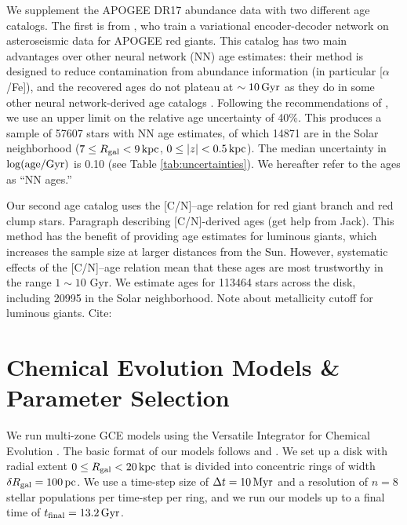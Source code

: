 \documentclass[twocolumn,twocolappendix,linenumbers]{aastex631}
\newcommand{\todo}[1]{{\color{red}#1}}
\begin{document}
We supplement the APOGEE DR17 abundance data with two different age catalogs. The first is from \citet{leung_variational_2023}, who train a variational encoder-decoder network on asteroseismic data for APOGEE red giants. This catalog has two main advantages over other neural network (NN) age estimates: their method is designed to reduce contamination from abundance information (in particular [$\alpha$/Fe]), and the recovered ages do not plateau at $\sim10\,{\rm Gyr}$ as they do in some other neural network-derived age catalogs \citep[e.g.,][]{mackereth_dynamical_2019}. Following the recommendations of \citet{leung_variational_2023}, we use an upper limit on the relative age uncertainty of 40\%. This produces a sample of \num{57607} stars with NN age estimates, of which \num{14871} are in the Solar neighborhood ($7\leq R_{\rm gal}<9\,{\rm kpc}$, $0\leq|z|<0.5\,{\rm kpc}$). The median uncertainty in $\log({\rm age}/{\rm Gyr})$ is 0.10 (see Table \ref{tab:uncertainties}). We hereafter refer to the \citet{leung_variational_2023} ages as ``NN ages.''

Our second age catalog uses the [C/N]--age relation for red giant branch and red clump stars. 
\todo{Paragraph describing [C/N]-derived ages (get help from Jack).}
This method has the benefit of providing age estimates for luminous giants, which increases the sample size at larger distances from the Sun. However, systematic effects of the [C/N]--age relation mean that these ages are most trustworthy in the range $1\sim10$ Gyr. We estimate ages for \num{113464} stars across the disk, including \num{20995} in the Solar neighborhood.
\todo{Note about metallicity cutoff for luminous giants. Cite: \citet{cao_modeling_2025}}

\section{Chemical Evolution Models \& Parameter Selection}
\label{sec:methods}

We run multi-zone GCE models using the Versatile Integrator for Chemical Evolution \citep[{\tt VICE};][]{johnson_impact_2020}. The basic format of our models follows \citet{johnson_stellar_2021} and \citet{dubay_galactic_2024}. We set up a disk with radial extent $0\leq R_{\rm gal}<20\,{\rm kpc}$ that is divided into concentric rings of width $\delta R_{\rm gal}=100\,{\rm pc}$. We use a time-step size of $\Delta t=10\,{\rm Myr}$ and a resolution of $n=8$ stellar populations per time-step per ring, and we run our models up to a final time of $t_{\rm final}=13.2\,{\rm Gyr}$.
\end{document}
